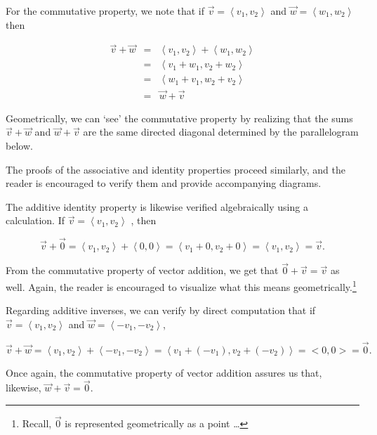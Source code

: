 \documentclass{ximera}
\begin{document}
For the commutative property, we note that if $\overrightarrow{v} = \left<v_1,v_2\right>$ and $\overrightarrow{w} = \left<w_1,w_2\right>$ then

\[ \begin{array}{rcl} \overrightarrow{v} + \overrightarrow{w}  & = &  \left< v_1, v_2 \right> +  \left<  w_1, w_2 \right> \\
& = & \left< v_1 + w_1, v_2 + w_2 \right> \\
& = &  \left< w_1 + v_1, w_2 + v_2 \right> \\
& = & \overrightarrow{w} + \overrightarrow{v} \end{array} \]

Geometrically, we can `see' the commutative property by realizing that the sums $\overrightarrow{v}+\overrightarrow{w}$ and $\overrightarrow{w} + \overrightarrow{v}$ are the same directed diagonal determined by the parallelogram below.

\begin{center} 
\end{center}

The proofs of the associative and identity properties proceed similarly, and the reader is encouraged to verify them and provide accompanying diagrams.  

The additive identity property is likewise verified algebraically using a calculation.  If $\overrightarrow{v} = \left<v_1,v_2\right>$ , then

 \[ \overrightarrow{v} + \overrightarrow{0} = \left<v_1,v_2\right> + \left<0, 0\right> = \left< v_1 + 0, v_2 + 0 \right> =  \left<v_1,v_2\right>  = \overrightarrow{v}.\]
 
 From the commutative property of vector addition, we get that $\overrightarrow{0} + \overrightarrow{v} = \overrightarrow{v}$ as well.  Again, the reader is encouraged to visualize what this means geometrically.\footnote{Recall, $\overrightarrow{0}$ is represented geometrically as a point \ldots}

Regarding additive inverses, we can verify by direct computation that if $\overrightarrow{v} = \left< v_1, v_2 \right>$ and  $\overrightarrow{w} = \left< - v_1, -v_2 \right>$, 

\[ \overrightarrow{v} + \overrightarrow{w} = \left< v_1, v_2 \right> + \left< - v_1, -v_2 \right> = \left<  v_1 + ( - v_1), v_2 + ( - v_2) \right> = <0,0> = \overrightarrow{0}.\]

Once again, the commutative property of vector addition assures us  that, likewise, $\overrightarrow{w} + \overrightarrow{v} = \overrightarrow{0}$.
\end{document}
